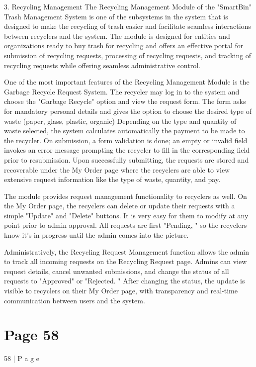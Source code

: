 \documentclass{article}
\begin{document}
 
 
3. Recycling Management 
The Recycling Management Module of the "SmartBin" Trash Management System is one of 
the subsystems in the system that is designed to make the recycling of trash easier and 
facilitate seamless interactions between recyclers and the system. The module is designed 
for entities and organizations ready to buy trash for recycling and offers an effective portal 
for submission of recycling requests, processing of recycling requests, and tracking of 
recycling requests while offering seamless administrative control. 
  
One of the most important features of the Recycling Management Module is the Garbage 
Recycle Request System. The recycler may log in to the system and choose the "Garbage 
Recycle" option and view the request form. The form asks for mandatory personal details 
and gives the option to choose the desired type of waste (paper, glass, plastic, organic) 
Depending on the type and quantity of waste selected, the system calculates 
automatically the payment to be made to the recycler. On submission, a form validation is 
done; an empty or invalid field invokes an error message prompting the recycler to fill in the 
corresponding field prior to resubmission. Upon successfully submitting, the requests are 
stored and recoverable under the My Order page where the recyclers are able to view 
extensive request information like the type of waste, quantity, and pay. 
  
The module provides request management functionality to recyclers as well. On the My 
Order page, the recyclers can delete or update their requests with a simple "Update" and 
"Delete" buttons. It is very easy for them to modify at any point prior to admin approval. All 
requests are first "Pending, " so the recyclers know it's in progress until the admin comes 
into the picture. 
  
Administratively, the Recycling Request Management function allows the admin to track all 
incoming requests on the Recycling Request page. Admins can view request details, 
cancel unwanted submissions, and change the status of all requests to "Approved" or 
"Rejected. " After changing the status, the update is visible to recyclers on their My Order 
page, with transparency and real-time communication between users and the system. 
  

\section*{Page 58}
58 | P a g e 
 
\end{document}
